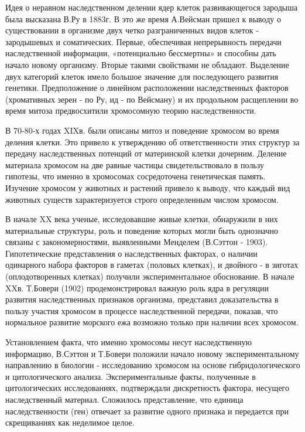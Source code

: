 \documentclass[exam_answers.tex]{subfiles}
\begin{document}
Идея о неравном наследственном делении ядер клеток развивающегося
зародыша была высказана В.Ру в 1883г. В это же время А.Вейсман пришел к
выводу о существовании в организме двух четко разграниченных видов клеток
- зародышевых и соматических. Первые, обеспечивая непрерывность передачи
наследственной информации, «потенциально бессмертны» и способны дать
начало новому организму. Вторые такими свойствами не обладают. Выделение
двух категорий клеток имело большое значение для последующего развития
генетики. Предположение о линейном расположении наследственных факторов
(хромативных зерен - по Ру, ид - по Вейсману) и их продольном расщеплении
во время митоза предвосхитили хромосомную теорию наследственности.

В 70-80-х годах XIXв. были описаны митоз и поведение хромосом во
время деления клетки. Это привело к утверждению об ответственности этих
структур за передачу наследственных потенций от материнской клетки
дочерним. Деление материала хромосом на две равные частицы
свидетельствовало в пользу гипотезы, что именно в хромосомах сосредоточена
генетическая память. Изучение хромосом у животных и растений привело к
выводу, что каждый вид животных существ характеризуется строго
определенным числом хромосом.

В начале XX века ученые, исследовавшие живые клетки, обнаружили в
них материальные структуры, роль и поведение которых могли быть
однозначно связаны с закономерностями, выявленными Менделем (В.Сэттон -
1903). Гипотетические представления о наследственных факторах, о наличии
одинарного набора факторов в гаметах (половых клетках), и двойного - в
зиготах (оплодотворенных клетках) получили экспериментальное обоснование.
В начале XXв. Т.Бовери (1902) продемонстрировал важную роль ядра в
регуляции развития наследственных признаков организма, представил
доказательства в пользу участия хромосом в процессе наследственной
передачи, показав, что нормальное развитие морского ежа возможно только при
наличии всех хромосом.

Установлением факта, что именно хромосомы несут наследственную
информацию, В.Сэттон и Т.Бовери положили начало новому
экспериментальному направлению в биологии - исследованию хромосом на
основе гибридологического и цитологического анализа. Экспериментальные
факты, полученные в цитологических исследованиях, подтверждали
дискретность фактора, несущего наследственный материал. Сложилось
представление, что единица наследственности (ген) отвечает за развитие
одного признака и передается при скрещиваниях как неделимое целое.
\end{document}
